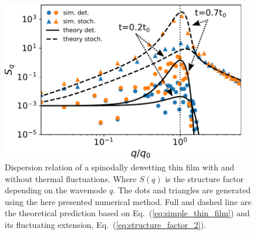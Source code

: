 \begin{figure}
    \centering
    \includegraphics[width=0.95\textwidth]{graphics/spectratheta20.pdf}
    \caption{Dispersion relation of a spinodally dewetting thin film with and without thermal fluctuations.
    Where $S(q)$ is the structure factor depending on the wavemode $q$.
    The dots and triangles are generated using the here presented numerical method. 
    Full and dashed line are the theoretical prediction based on Eq.~(\ref{eq:simple_thin_film}) and its fluctuating extension, Eq.~(\ref{eq:structure_factor_2}).
    }
    \label{fig:dispertion_1}
\end{figure}


